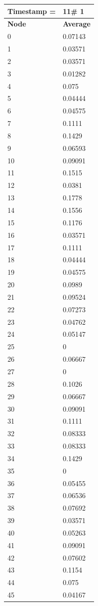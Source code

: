 \begin{tabular}{|l||l|}
\hline
\textbf{Timestamp =} & \textbf{11}\# 1\\\hline
	\textbf{Node} & \textbf{Average} \\ \hline
\hline
	0 & 0.07143 \\ \hline
	1 & 0.03571 \\ \hline
	2 & 0.03571 \\ \hline
	3 & 0.01282 \\ \hline
	4 & 0.075 \\ \hline
	5 & 0.04444 \\ \hline
	6 & 0.04575 \\ \hline
	7 & 0.1111 \\ \hline
	8 & 0.1429 \\ \hline
	9 & 0.06593 \\ \hline
	10 & 0.09091 \\ \hline
	11 & 0.1515 \\ \hline
	12 & 0.0381 \\ \hline
	13 & 0.1778 \\ \hline
	14 & 0.1556 \\ \hline
	15 & 0.1176 \\ \hline
	16 & 0.03571 \\ \hline
	17 & 0.1111 \\ \hline
	18 & 0.04444 \\ \hline
	19 & 0.04575 \\ \hline
	20 & 0.0989 \\ \hline
	21 & 0.09524 \\ \hline
	22 & 0.07273 \\ \hline
	23 & 0.04762 \\ \hline
	24 & 0.05147 \\ \hline
	25 & 0 \\ \hline
	26 & 0.06667 \\ \hline
	27 & 0 \\ \hline
	28 & 0.1026 \\ \hline
	29 & 0.06667 \\ \hline
	30 & 0.09091 \\ \hline
	31 & 0.1111 \\ \hline
	32 & 0.08333 \\ \hline
	33 & 0.08333 \\ \hline
	34 & 0.1429 \\ \hline
	35 & 0 \\ \hline
	36 & 0.05455 \\ \hline
	37 & 0.06536 \\ \hline
	38 & 0.07692 \\ \hline
	39 & 0.03571 \\ \hline
	40 & 0.05263 \\ \hline
	41 & 0.09091 \\ \hline
	42 & 0.07602 \\ \hline
	43 & 0.1154 \\ \hline
	44 & 0.075 \\ \hline
	45 & 0.04167 \\ \hline
\end{tabular}
